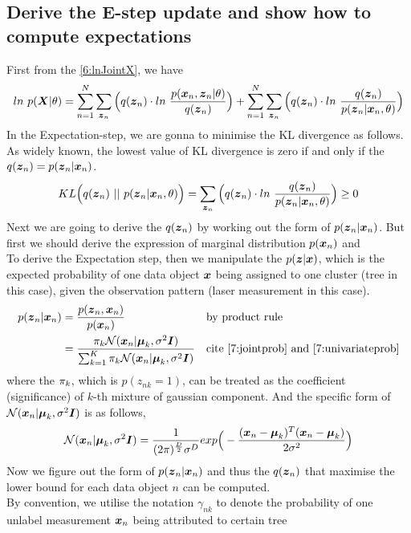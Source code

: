 \documentclass[11pt,a4paper]{article}
\newcommand{\htab}{\hspace*{0.63cm}}
\newcommand{\bs}[1]{\boldsymbol{#1}}
\begin{document}
\subsection{Derive the E-step update and show how to compute expectations}
\htab First from the \eqref{6:lnJointX}, we have
\begin{align}
    ln\ p(\bs{X} | \theta)
    = \sumn  \sumzn \Big( q(\zn) \cdot ln\ \frac{p (\xn, \zn | \theta)}{q(\zn)} \Big) 
    + \sumn \sumzn \Big(  q(\zn) \cdot ln\ \frac{q(\zn)}{p(\zn | \xn, \theta)} \Big) 
    \end{align}
\htab In the Expectation-step, we are gonna to minimise the KL divergence as follows. As widely known,
the lowest value of KL divergence is zero if and only if the $q(\zn) = p(\zn | \xn)$. 
\begin{align}
    KL \Big(q(\zn)\ ||\ p(\zn | \xn, \theta) \Big) 
    = \sumzn \Big(  q(\zn) \cdot ln\ \frac{q(\zn)}{p(\zn | \xn, \theta)} \Big) \geq 0 \label{6:KLdiv}
    \end{align}
\htab Next we are going to derive the $q(\zn)$ by working out the form of $p(\zn | \xn)$. But first
we should derive the expression of marginal distribution $p(\xn)$ and  \\
\htab To derive the Expectation step, then we manipulate the $p(\z|\x)$, which is the 
expected probability of one data object $\x$ being assigned to one cluster (tree in 
this case), given the observation pattern (laser measurement in this case). 
\begin{align}
    p(\zn | \xn) 
    &= \frac{p(\zn , \xn)}{p(\xn)}  &&\mbox{by product rule} \\
    &= \frac{\pk \Nxn }{\sumk \pk \Nxn} 
    &&\mbox{cite \eqref{7:jointprob} and \eqref{7:univariateprob}} \label{7:z|x}
    \end{align}
\htab where the $\pi_{k}$, which is $p(z_{nk}=1)$, can be treated as the coefficient 
(significance) of $k$-th mixture of gaussian component. And the specific form of 
$\Nxn$ is as follows, 
\begin{align} 
    \Nk = \frac{1}{(2\pi)^{\frac{D}{2}} \sigma^{D}} exp \Big( -\frac{(\difxm)^{T} (\difxm)}{2\sigma^{2}}\Big)
    \end{align}
\htab Now we figure out the form of $p(\zn|\xn)$ and thus the $q(\zn)$ that maximise the lower bound for
each data object $n$ can be computed. \\
\htab By convention, we utilise the notation $\gamma_{nk}$ to 
denote the probability of one unlabel measurement $\xn$ being attributed to certain tree
\end{document}
